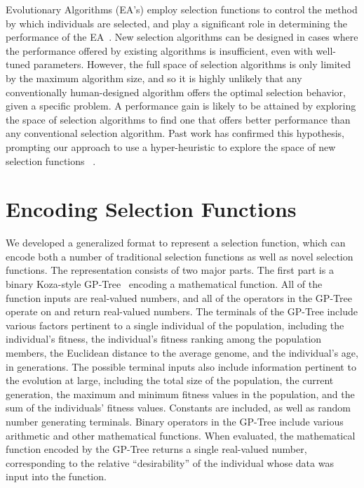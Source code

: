 \documentclass[sigconf]{acmart}
\begin{document}
Evolutionary Algorithms (EA's) employ selection functions to control the method by which individuals are selected, and play a significant role in determining the performance of the EA~\citep{woodward2010metaBias}. New selection algorithms can be designed in cases where the performance offered by existing algorithms is insufficient, even with well-tuned parameters. However, the full space of selection algorithms is only limited by the maximum algorithm size, and so it is highly unlikely that any conventionally human-designed algorithm offers the optimal selection behavior, given a specific problem. A performance gain is likely to be attained by exploring the space of selection algorithms to find one that offers better performance than any conventional selection algorithm. Past work has confirmed this hypothesis, prompting our approach to use a hyper-heuristic to explore the space of new selection functions ~\citep{woodward2011selection}.


\section{Encoding Selection Functions}
\label{Encoding Selection Functions}

We developed a generalized format to represent a selection function, which can encode both a number of traditional selection functions as well as novel selection functions. The representation consists of two major parts. The first part is a binary Koza-style GP-Tree~\citep{koza1994genetic} encoding a mathematical function. All of the function inputs are real-valued numbers, and all of the operators in the GP-Tree operate on and return real-valued numbers. The terminals of the GP-Tree include various factors pertinent to a single individual of the population, including the individual's fitness, the individual's fitness ranking among the population members, the Euclidean distance to the average genome, and the individual's age, in generations. The possible terminal inputs also include information pertinent to the evolution at large, including the total size of the population, the current generation, the maximum and minimum fitness values in the population, and the sum of the individuals' fitness values. Constants are included, as well as random number generating terminals. Binary operators in the GP-Tree include various arithmetic and other mathematical functions. When evaluated, the mathematical function encoded by the GP-Tree returns a single real-valued number, corresponding to the relative ``desirability'' of the individual whose data was input into the function.
\end{document}
